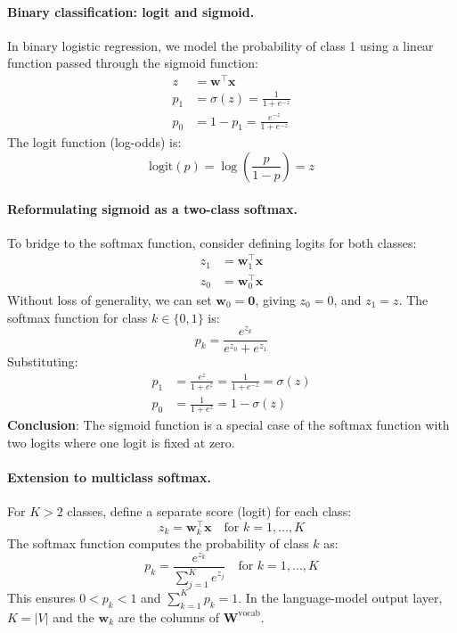 \documentclass[11pt]{article}
\theoremstyle{remark}
\begin{document}
\paragraph{Binary classification: logit and sigmoid.}
In binary logistic regression, we model the probability of class 1 using a linear function passed through the sigmoid function:
\begin{align}
z &= \mathbf{w}^\top \mathbf{x} \\
p_1 &= \sigma(z) = \frac{1}{1 + e^{-z}} \\
p_0 &= 1 - p_1 = \frac{e^{-z}}{1 + e^{-z}}
\end{align}
The logit function (log-odds) is:
\begin{equation}
\text{logit}(p) = \log\left( \frac{p}{1 - p} \right) = z
\end{equation}

\paragraph{Reformulating sigmoid as a two-class softmax.}
To bridge to the softmax function, consider defining logits for both classes:
\begin{align}
z_1 &= \mathbf{w}_1^\top \mathbf{x} \\
z_0 &= \mathbf{w}_0^\top \mathbf{x}
\end{align}
Without loss of generality, we can set \( \mathbf{w}_0 = \mathbf{0} \), giving \( z_0 = 0 \), and \( z_1 = z \). The softmax function for class \( k \in \{0, 1\} \) is:
\begin{equation}
p_k = \frac{e^{z_k}}{e^{z_0} + e^{z_1}}
\end{equation}
Substituting:
\begin{align}
p_1 &= \frac{e^{z}}{1 + e^{z}} = \frac{1}{1 + e^{-z}} = \sigma(z) \\
p_0 &= \frac{1}{1 + e^{z}} = 1 - \sigma(z)
\end{align}
\textbf{Conclusion}: The sigmoid function is a special case of the softmax function with two logits where one logit is fixed at zero.

\paragraph{Extension to multiclass softmax.}
For \( K > 2 \) classes, define a separate score (logit) for each class:
\begin{equation}
z_k = \mathbf{w}_k^\top \mathbf{x} \quad \text{for } k = 1, \dots, K
\end{equation}
The softmax function computes the probability of class \( k \) as:
\begin{equation}
p_k = \frac{e^{z_k}}{\sum_{j=1}^K e^{z_j}} \quad \text{for } k = 1, \dots, K
\end{equation}
This ensures \( 0 < p_k < 1 \) and \( \sum_{k=1}^{K} p_k = 1 \). In the language-model output layer, \(K = |V|\) and the \(\mathbf{w}_k\) are the columns of \(\mathbf{W}^{\text{vocab}}\).
\end{document}
